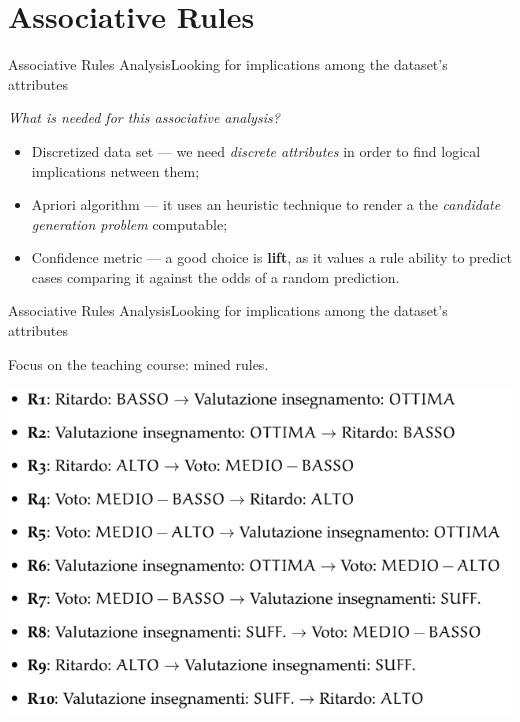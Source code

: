 \section{Associative Rules}

\begin{frame}{Associative Rules Analysis}{Looking for implications among the dataset's attributes}

 \centering\textit{What is needed for this associative analysis?} \vspace{0,3cm}

	\begin{block}{}
		\begin{itemize}
			\item<1-> \alert{Discretized data set} --- we need \emph{discrete attributes} in order to find logical implications netween them;
			\item<2-> \alert{Apriori algorithm} --- it uses an heuristic technique to render a the \emph{candidate generation problem} computable;
			\item<3-> \alert{Confidence metric} --- a good choice is \textbf{lift}, as it values a rule ability to predict cases comparing it against the odds of a random prediction.
		\end{itemize}
	\end{block}

\end{frame}

\begin{frame}{Associative Rules Analysis}{Looking for implications among the dataset's attributes}

    Focus on the \alert{teaching course}: mined rules.

    \vspace{0.5cm}
    \begin{centering}
        \hspace{0.5cm}\includegraphics[scale=0.36]{ass2.png}
    \end{centering}

\end{frame}

